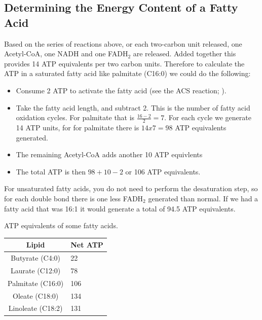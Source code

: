 \documentclass{tufte-handout}
\begin{document}

\subsection{Determining the Energy Content of a Fatty Acid}

Based on the series of reactions above, or each two-carbon unit released, one Acetyl-CoA, one NADH and one FADH$_2$ are released.  Added together this provides 14 ATP equivalents per two carbon units.  Therefore to calculate the ATP in a saturated fatty acid like palmitate (C16:0) we could do the following:

\begin{itemize}
\item Consume 2 ATP to activate the fatty acid (see the ACS reaction; \label{eq:acs}).
\item Take the fatty acid length, and subtract 2.  This is the number of fatty acid oxidation cycles.  For palmitate that is $\frac{16-2}{2}=7$.  For each cycle we generate 14 ATP units, for for palmitate there is $14 x 7 = 98$ ATP equivalents generated.
\item The remaining Acetyl-CoA adds another 10 ATP equivlents
\item The total ATP is then $98+10-2$ or 106 ATP equivalents.
\end{itemize}

For unsaturated fatty acids, you do not need to perform the desaturation step, so for each double bond there is one less FADH$_2$ generated than normal.  If we had a fatty acid that was 16:1 it would generate a total of 94.5 ATP equivalents.

\begin{margintable}
\centering
\caption{ATP equivalents of some fatty acids.}
\label{tab:fatty-acid-energy}
\begin{tabular}{@{}cl@{}}
\toprule
\textbf{Lipid} & \textbf{Net ATP} \\ \midrule
Butyrate (C4:0)           &  22                \\
Laurate (C12:0)          & 78                    \\
Palmitate (C16:0)          & 106               \\
Oleate (C18:0)          & 134              \\
Linoleate (C18:2)          & 131            \\ \bottomrule
\end{tabular}
\end{margintable}
\end{document}
